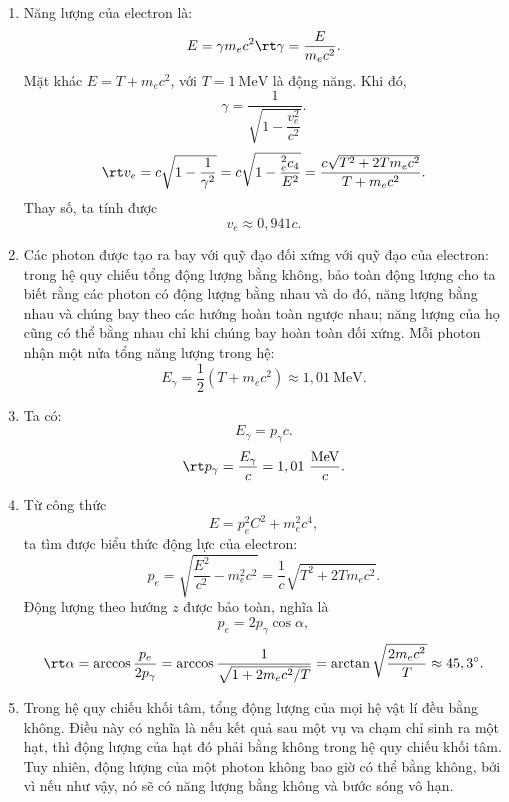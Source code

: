 \begin{loigiai}
    \begin{enumerate}[1)]
        \item Năng lượng của electron là:
        \[E=\gamma m_ec^2 \rt \gamma=\dfrac{E}{m_ec^2}.\]
        Mặt khác $E=T+m_ec^2$, với $T=1~\mathrm{MeV}$ là động năng. Khi đó, 
        \[\gamma=\dfrac{1}{\sqrt{1-\dfrac{v_e^2}{c^2}}}.\]
        $$\rt v_e=c\sqrt{1-\dfrac{1}{\gamma^2}}=c\sqrt{1-\dfrac{_e^2c_4}{E^2}}=\dfrac{c\sqrt{T^2+2Tm_ec^2}}{T+m_ec^2}.$$
        Thay số, ta tính được \[v_e \approx 0,941c.\]
        \item Các photon được tạo ra bay với quỹ đạo đối xứng với quỹ đạo của electron: trong hệ quy chiếu tổng động lượng bằng không, bảo toàn động lượng cho ta biết rằng các photon có động lượng bằng nhau và do đó, năng lượng bằng nhau và chúng bay theo các hướng hoàn toàn ngược nhau; năng lượng của họ cũng có thể bằng nhau chỉ khi chúng bay hoàn toàn đối xứng. Mỗi photon nhận một nửa tổng năng lượng trong hệ:
        \[E_\gamma=\dfrac{1}{2}\left( T+m_ec^2\right) \approx 1,01 ~\mathrm{MeV}.\]
        \item Ta có: \[E_\gamma=p_\gamma c.\]
        \[\rt p_\gamma=\dfrac{E_\gamma}{c}=1,01 ~\dfrac{\mathrm{MeV}}{c}.\]
        \item Từ công thức \[E=p_e^2C^2+m_e^2c^4,\]
        ta tìm được biểu thức động lực của electron:
        \[p_e=\sqrt{\dfrac{E^2}{c^2}-m_e^2c^2}=\dfrac{1}{c}\sqrt{T^2+2Tm_ec^2}.\]
        Động lượng theo hướng $z$ được bảo toàn, nghĩa là 
        \[p_e=2p_\gamma \cos\alpha,\]
        \[\rt \alpha=\arccos\dfrac{p_e}{2p_\gamma}=\arccos\dfrac{1}{\sqrt{1+2m_ec^2/T}}=\arctan\sqrt{\dfrac{2m_ec^2}{T}} \approx 45,3^\circ.\]
        \item Trong hệ quy chiếu khối tâm, tổng động lượng của mọi hệ vật lí đều bằng không. Điều này có nghĩa là nếu kết quả sau một vụ va chạm chỉ sinh ra một hạt, thì động lượng của hạt đó phải bằng không trong hệ quy chiếu khối tâm.
        \\Tuy nhiên, động lượng của một photon không bao giờ có thể bằng không, bởi vì nếu như vậy, nó sẽ có năng lượng bằng không và bước sóng vô hạn.
    \end{enumerate}
\end{loigiai}

